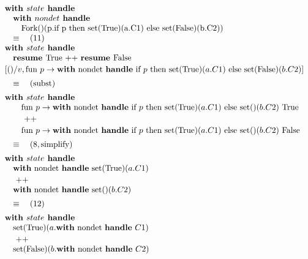 \documentclass[logo,bsc,singlespacing,parskip]{infthesis}
\begin{document}
\[
\begin{array}{l}
\textbf{with } state \textbf{ handle} \\
\quad\textbf{with } nondet \textbf{ handle} \\
\quad\quad \text{Fork()(p.if p then set(True)(a.C1) else set(False)(b.C2))}
\\
\quad\equiv\quad (11) \quad \\ 
\textbf{with } state \textbf{ handle} \\
 
\quad\textbf{resume } \text{True} \text{ ++ } \textbf{resume } \text{False} \\[2pt]
[()/v, \text{fun } p \rightarrow \text{\textbf{with} nondet \textbf{handle} if } p \text{ then set(True)}(a.C1) \text{ else set(False)}(b.C2)] \\[5pt]
\quad\equiv\quad (\text{subst}) \\[5pt] 
\textbf{with } state \textbf{ handle} \\
\quad
\quad\text{fun } p \rightarrow \text{\textbf{with} nondet \textbf{handle} if } p \text{ then set(True)}(a.C1) \text{ else set()}(b.C2)\ \text{True} \\[2pt]
\quad \quad \text{ ++ } \\[2pt]
\quad \quad \text{fun } p \rightarrow \text{\textbf{with} nondet \textbf{handle} if } p \text{ then set(True)}(a.C1) \text{ else set()}(b.C2)\ \text{False} \\[5pt]
\quad\equiv\quad (8, \text{simplify}) \\[5pt]
\textbf{with } state \textbf{ handle} \\
  
\quad \text{\textbf{with} nondet \textbf{handle} set(True)}(a.C1) \\[2pt]
\quad\text{ ++ } \\ 
\quad\text{\textbf{with} nondet \textbf{handle} set()}(b.C2) \\[5pt]
\quad\equiv\quad (12) \\[5pt]

\textbf{with } state \textbf{ handle} \\
\quad \text{set(True)}(a.\text{\textbf{with} nondet \textbf{handle} } C1) 
\quad \\[2pt]
\quad \text{ ++ } \\ 
\quad \text{set(False)}(b.\text{\textbf{with} nondet \textbf{handle} } C2) \\[5pt]
 
\end{array}
\]
\end{document}
